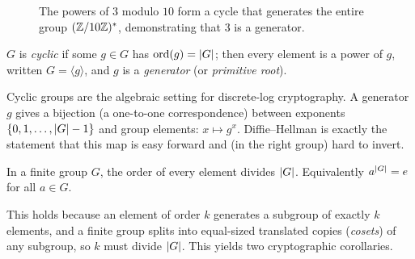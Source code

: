 \begin{figure}[htbp]
\centering
{}
\caption{The powers of $3$ modulo $10$ form a cycle that generates the entire group $(\mathbb{Z}/10\mathbb{Z})^{*}$, demonstrating that $3$ is a generator.}
\label{ch41:fig-cyclic-group}
\end{figure}


\begin{definition}
\label{ch41:def-cyclic}
$G$ is \emph{cyclic} if some $g\in G$ has $\operatorname{ord}(g)=\lvert G\rvert$; then every element is
a power of $g$, written $G=\langle g\rangle$, and $g$ is a \emph{generator} (or
\emph{primitive root}).
\end{definition}

\begin{focusbox}
Cyclic groups are the algebraic setting for discrete-log cryptography. A generator $g$
gives a bijection (a one-to-one correspondence) between exponents $\{0,1,\dots,\lvert G\rvert-1\}$ and group elements:
$x \mapsto g^x$. Diffie--Hellman is exactly the statement that this map is easy
forward and (in the right group) hard to invert.
\end{focusbox}

\begin{theorem}
\label{ch41:thm-lagrange}
In a finite group $G$, the order of every element divides $\lvert G\rvert$. Equivalently
$a^{\lvert G\rvert} = e$ for all $a\in G$.
\end{theorem}

This holds because an element of order $k$ generates a subgroup of
exactly $k$ elements, and a finite group splits into equal-sized translated copies
(\emph{cosets}) of any subgroup, so $k$ must divide $\lvert G\rvert$. This yields two cryptographic corollaries.

